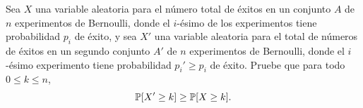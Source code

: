 \begin{statement}{25}
  Sea $X$ una variable aleatoria para el n\'umero total de \'exitos en un conjunto $A$ de $n$ experimentos
  de Bernoulli, donde el $i$-\'esimo de los experimentos tiene probabilidad $p_i$ de \'exito, y sea $X'$
  una variable aleatoria para el total de n\'umeros de \'exitos en un segundo conjunto $A'$ de $n$
  experimentos de Bernoulli, donde el $i$-\'esimo experimento tiene probabilidad $p_i' \geq p_i$ de \'exito.
  Pruebe que para todo $0 \leq k \leq n$,
  \[
    \mathbb{P}[X' \geq k] \geq \mathbb{P}[X \geq k].
  \]
\end{statement}